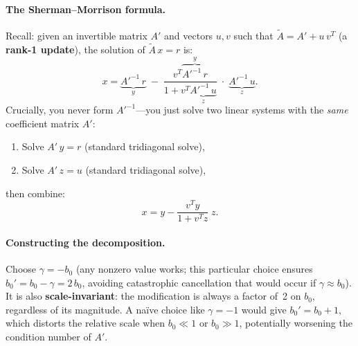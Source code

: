 \documentclass[11pt]{article}
\begin{document}
\paragraph{The Sherman--Morrison formula.}
Recall: given an invertible matrix $A'$ and vectors $u, v$ such that
$\tilde{A} = A' + u\,v^T$ (a \textbf{rank-1 update}), the solution
of $\tilde{A}\,x = r$ is:
\[
x = \underbrace{A'^{-1}\,r}_{y}
  \;-\; \frac{v^T\!\overbrace{A'^{-1}\,r}^{y}}
             {1 + v^T\!\underbrace{A'^{-1}\,u}_{z}}
       \;\cdot\;\underbrace{A'^{-1}\,u}_{z}.
\]
Crucially, you never form $A'^{-1}$---you just solve two linear
systems with the \emph{same} coefficient matrix $A'$:
\begin{enumerate}
\item Solve $A'\,y = r$ \quad (standard tridiagonal solve),
\item Solve $A'\,z = u$ \quad (standard tridiagonal solve),
\end{enumerate}
then combine:
\[
x = y - \frac{v^T y}{1 + v^T z}\; z.
\]

\paragraph{Constructing the decomposition.}
Choose $\gamma = -b_0$ (any nonzero value works; this particular
choice ensures $b_0' = b_0 - \gamma = 2\,b_0$, avoiding catastrophic
cancellation that would occur if $\gamma \approx b_0$). It is also
\textbf{scale-invariant}: the modification is always a factor of~2
on $b_0$, regardless of its magnitude. A na\"ive choice like
$\gamma = -1$ would give $b_0' = b_0 + 1$, which distorts the
relative scale when $b_0 \ll 1$ or $b_0 \gg 1$, potentially
worsening the condition number of $A'$.
\end{document}
